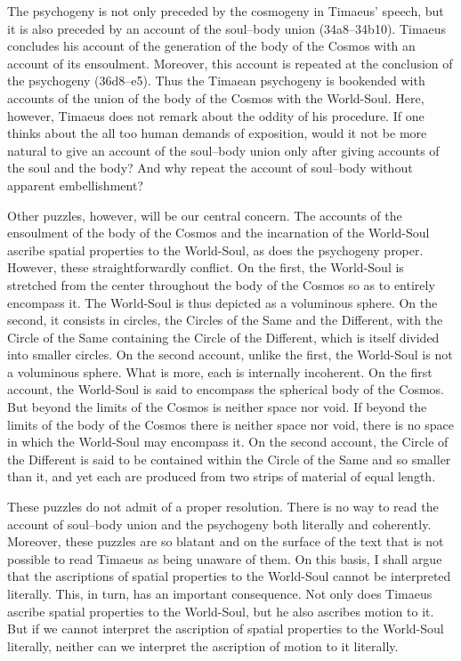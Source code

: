 The psychogeny is not only preceded by the cosmogeny in Timaeus' speech, but it is also preceded by an account of the soul--body union (34a8–34b10). Timaeus concludes his account of the generation of the body of the Cosmos with an account of its ensoulment. Moreover, this account is repeated at the conclusion of the psychogeny (36d8--e5). Thus the Timaean psychogeny is bookended with accounts of the union of the body of the Cosmos with the World-Soul. Here, however, Timaeus does not remark about the oddity of his procedure. If one thinks about the all too human demands of exposition, would it not be more natural to give an account of the soul--body union only after giving accounts of the soul and the body? And why repeat the account of soul--body without apparent embellishment? 

Other puzzles, however, will be our central concern. The accounts of the ensoulment of the body of the Cosmos and the incarnation of the World-Soul ascribe spatial properties to the World-Soul, as does the psychogeny proper. However, these straightforwardly conflict. On the first, the World-Soul is stretched from the center throughout the body of the Cosmos so as to entirely encompass it. The World-Soul is thus depicted as a voluminous sphere. On the second, it consists in circles, the Circles of the Same and the Different, with the Circle of the Same containing the Circle of the Different, which is itself divided into smaller circles. On the second account, unlike the first, the World-Soul is not a voluminous sphere. What is more, each is internally incoherent. On the first account, the World-Soul is said to encompass the spherical body of the Cosmos. But beyond the limits of the Cosmos is neither space nor void. If beyond the limits of the body of the Cosmos there is neither space nor void, there is no space in which the World-Soul may encompass it. On the second account, the Circle of the Different is said to be contained within the Circle of the Same and so smaller than it, and yet each are produced from two strips of material of equal length. 

These puzzles do not admit of a proper resolution. There is no way to read the account of soul--body union and the psychogeny both literally and coherently. Moreover, these puzzles are so blatant and on the surface of the text that is not possible to read Timaeus as being unaware of them. On this basis, I shall argue that the ascriptions of spatial properties to the World-Soul cannot be interpreted literally. This, in turn, has an important consequence. Not only does Timaeus ascribe spatial properties to the World-Soul, but he also ascribes motion to it. But if we cannot interpret the ascription of spatial properties to the World-Soul literally, neither can we interpret the ascription of motion to it literally. 

